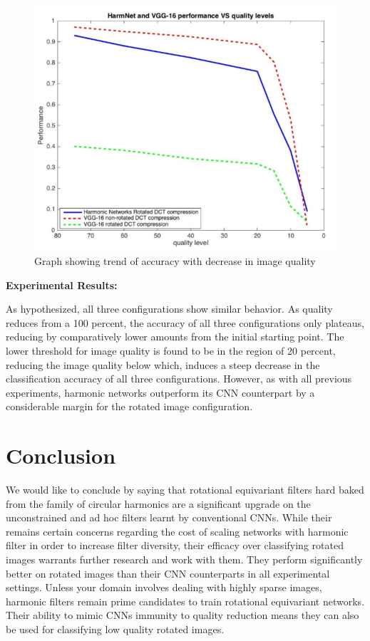 \documentclass{article}
\begin{document}
\begin{figure}[t!]
  \includegraphics[width=\linewidth]{vggAndHarmVsquality.png}
  \caption{Graph showing trend of accuracy with decrease in image quality}
  \label{fig:SparseGraph}
\end{figure}

\textbf{Experimental Results:}

As hypothesized, all three configurations show similar behavior. As quality reduces from a 100 percent, the accuracy of all three configurations only plateaus, reducing by comparatively lower amounts from the initial starting point. The lower threshold for image quality is found to be in the region of 20 percent, reducing the image quality below which, induces a steep decrease in the classification accuracy of all three configurations. However, as with all previous experiments, harmonic networks outperform its CNN counterpart by a considerable margin for the rotated image configuration.


\section{Conclusion}

We would like to conclude by saying that rotational equivariant filters hard baked from the family of circular harmonics are a significant upgrade on the unconstrained and ad hoc filters learnt by conventional CNNs. While their remains certain concerns regarding the cost of scaling networks with harmonic filter in order to increase filter diversity, their efficacy over classifying rotated images warrants further research and work with them. They perform significantly better on rotated images than their CNN counterparts in all experimental settings. Unless your domain involves dealing with highly sparse images, harmonic filters remain prime candidates to train rotational equivariant networks. Their ability to mimic CNNs immunity to quality reduction means they can also be used for classifying low quality rotated images.
\end{document}
